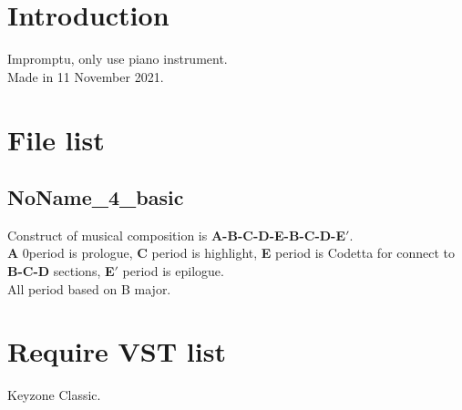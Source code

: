 \documentclass{article}
\author{Seycho Han}
\begin{document}
\begin{CJK}{UTF8}{ipxm}

\section{Introduction}
Impromptu, only use piano instrument.\\
Made in 11 November 2021.
\\
\section{File list}
\subsection{NoName\_4\_basic}
Construct of musical composition is \textbf{A-B-C-D-E-B-C-D-E$'$}.\\
\textbf{A} 0period is prologue, \textbf{C} period is highlight, \textbf{E} period is Codetta for connect to \textbf{B-C-D} sections, \textbf{E$'$} period is epilogue.\\
All period based on B major.
\\

\section{Require VST list}
Keyzone Classic\cite{keyzone}.
\\




\end{CJK}
\end{document}
